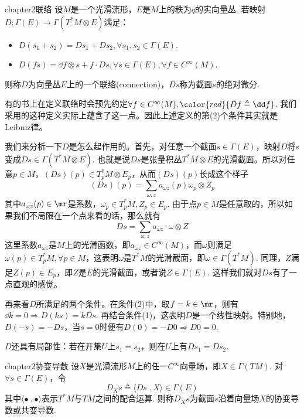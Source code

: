 \begin{mydef}{}{chapter2联络}
	设$M$是一个光滑流形，$E$是$M$上的秩为$q$的实向量丛. 若映射$D:\Gamma(E)\longrightarrow \Gamma(T^{\ast}M\otimes E)$满足：
	\begin{itemize}
		\item[(1)] $D(s_{1}+s_{2})=Ds_{1}+Ds_{2},\forall s_{1},s_{2}\in \Gamma(E)$.
		\item[(2)] $D(f s)=\dd f\otimes s+f\cdot Ds,\forall s\in \Gamma(E),\forall f\in C^{\infty}(M)$.
	\end{itemize}
则称$D$为向量丛$E$上的一个联络(connection)，$Ds$称为截面$s$的绝对微分.
\end{mydef}

\begin{remark}
	有的书上在定义联络时会预先约定$\forall f\in C^{\infty}(M),{\color{red}{Df\triangleq \dd f}}$. 我们采用的这种定义实际上蕴含了这一点。因此上述定义的第(2)个条件其实就是Leibniz律。
\end{remark}

我们来分析一下$D$是怎么起作用的。首先，对任意一个截面$s\in \Gamma(E)$，映射$D$将$s$变成$Ds\in \Gamma(T^{\ast}M\otimes E)$. 也就是说$Ds$是张量积丛$T^{\ast}M\otimes E$的光滑截面。所以对任意$p\in M$，$(Ds)(p)\in T^{\ast}_{p}M\otimes E_{p}$，从而$(Ds)(p)$长成这个样子
\[
(Ds)(p)=\sum_{ \omega,z }a_{\omega z}(p)  \omega_{p}\otimes Z_{p}
\]
其中$a_{\omega z}(p)\in \mr$是系数，$\omega_{p}\in T^{\ast}_{p}M,Z_{p}\in E_{p}$. 由于点$p\in M$是任意取的，所以如果我们不局限在一个点来看的话，那么就有
\[
Ds=\sum_{ \omega,z }a_{\omega z}\cdot \omega\otimes Z
\]
这里系数$a_{\omega z}$是$M$上的光滑函数，即$a_{\omega z}\in C^{\infty}(M)$，而$\omega$则满足$\omega(p)\in T^{\ast}_{p}M,\forall p\in M$，这表明$\omega$是$T^{\ast}M$的光滑截面，即$\omega\in \Gamma(T^{\ast}M)$. 同理，$Z$满足$Z(p)\in E_{p}$，即$Z$是$E$的光滑截面，或者说$Z\in \Gamma(E)$. 这样我们就对$Ds$有了一点直观的感觉。

再来看$D$所满足的两个条件。在条件(2)中，取$f=k\in\mr$，则有$\dd k=0\Rightarrow D(k  s)=k  Ds$. 再结合条件(1)，这表明$D$是一个线性映射。特别地，$D(-s)=-Ds$，当$s=0$时便有$D(0)=-D0\Rightarrow D0=0$. 

$D$还具有局部性：若在开集$U$上$s_{1}=s_{2}$，则在$U$上有$Ds_{1}=Ds_{2}$.

\begin{mydef}{}{chapter2协变导数}
	设$X$是光滑流形$M$上的任一$C^{\infty}$向量场，即$X\in \Gamma(TM)$. 对$\forall s\in \Gamma(E)$，令
	\[
	D_{X}s\triangleq\langle Ds\;,X \rangle \in \Gamma(E)
	\]
	其中$\langle \bullet\;,\bullet\rangle $表示$T^{\ast}M$与$TM$之间的配合运算. 则称$D_{X}s$为截面$s$沿着向量场$X$的协变导数或共变导数.
\end{mydef}

